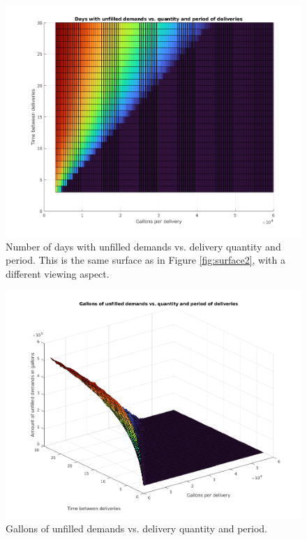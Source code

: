 \documentclass{article}
\begin{document}
    \begin{figure}[p]
        \centering
        \includegraphics[width=\textwidth]{img/surface2.1.png}
        \caption{Number of days with unfilled demands vs. delivery quantity and period. This is the same surface as in Figure \ref{fig:surface2}, with a different viewing aspect.}
        \label{fig:surface21}
    \end{figure}

    \begin{figure}[p]
        \centering
        \includegraphics[width=\textwidth]{img/surface3.png}
        \caption{Gallons of unfilled demands vs. delivery quantity and period.}
        \label{fig:surface3}
    \end{figure}
\end{document}
